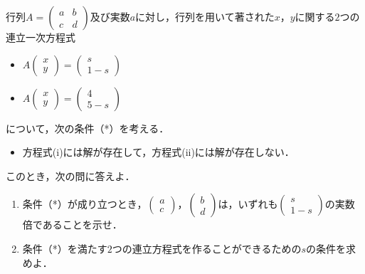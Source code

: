 \documentclass[../../main.tex]{subfiles}
\begin{document}
行列$A=
\begin{pmatrix}a&b\\ c&d
\end{pmatrix}$及び実数$a$に対し，行列を用いて著された$x$，$y$に関する$2$つの連立一次方程式
\begin{itemize}
  \item[(i)] $A
    \begin{pmatrix} x\\ y
    \end{pmatrix}=
    \begin{pmatrix} s\\ 1-s
    \end{pmatrix}$
  \item[(ii)] $A
    \begin{pmatrix} x\\ y
    \end{pmatrix}=
    \begin{pmatrix} 4\\ 5-s
    \end{pmatrix}$
\end{itemize}
について，次の条件（*）を考える．
\begin{itemize}
  \item[（*）] 方程式(i)には解が存在して，方程式(ii)には解が存在しない．
\end{itemize}
このとき，次の問に答えよ．
\begin{enumerate}
  \item 条件（*）が成り立つとき，$
    \begin{pmatrix} a\\ c
    \end{pmatrix}$，$
    \begin{pmatrix} b\\ d
    \end{pmatrix}$は，いずれも$
    \begin{pmatrix} s\\ 1-s
    \end{pmatrix}$の実数倍であることを示せ．
  \item 条件（*）を満たす$2$つの連立方程式を作ることができるための$s$の条件を求めよ．
\end{enumerate}
\end{document}
